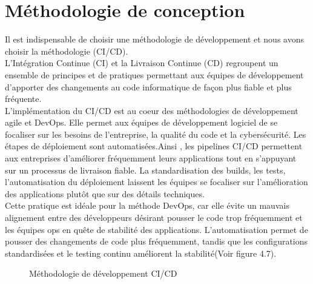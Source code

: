 \section{\selectfont\Large Méthodologie de conception}
Il est indispensable de choisir une méthodologie de développement  et nous avons choisir la méthodologie (CI/CD). \\
L’Intégration Continue (CI) et la Livraison Continue (CD) regroupent un ensemble de principes et de pratiques permettant aux équipes de développement d’apporter des changements au code informatique de façon plus fiable et plus fréquente.\\
L’implémentation du CI/CD est au coeur des méthodologies de développement agile et DevOps. Elle permet aux équipes de développement logiciel de se focaliser sur les besoins de l’entreprise, la qualité du code et la cybersécurité. Les étapes de déploiement sont automatisées.Ainsi , les pipelines CI/CD permettent aux entreprises d’améliorer fréquemment leurs applications tout en s’appuyant sur un processus de livraison fiable. La standardisation des builds, les tests, l’automatisation du déploiement laissent les équipes se focaliser sur l’amélioration des applications plutôt que sur des détails techniques.\\
Cette pratique est idéale pour la méthode DevOps, car elle évite un mauvais alignement entre des développeurs désirant pousser le code trop fréquemment et les équipes ops en quête de stabilité des applications. L’automatisation permet de pousser des changements de code plus fréquemment, tandis que les configurations standardisées et le testing continu améliorent la stabilité\cite{20}(Voir figure 4.7).\\[0.1cm]
\begin{figure}[H]
  \begin{center}
  

  \end{center}
  
  \caption{Méthodologie de développement CI/CD}
\end{figure}

